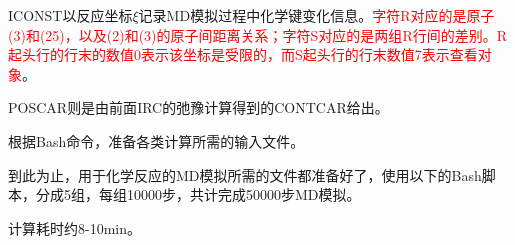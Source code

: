 \textrm{ICONST}以反应坐标$\xi$记录\textrm{MD}模拟过程中化学键变化信息。\textcolor{red}{字符\textrm{R}对应的是原子(3)和(25)，以及(2)和(3)的原子间距离关系；字符\textrm{S}对应的是两组\textrm{R}行间的差别。\textrm{R}起头行的行末的数值0表示该坐标是受限的，而\textrm{S}起头行的行末数值7表示查看对象}。

\textrm{POSCAR}则是由前面\textrm{IRC}的弛豫计算得到的\textrm{CONTCAR}给出。

根据\textrm{Bash}命令，准备各类计算所需的输入文件。


到此为止，用于化学反应的\textrm{MD}模拟所需的文件都准备好了，使用以下的\textrm{Bash}脚本，分成5组，每组10000步，共计完成50000步\textrm{MD}模拟。

计算耗时约8-10\textrm{min}。



